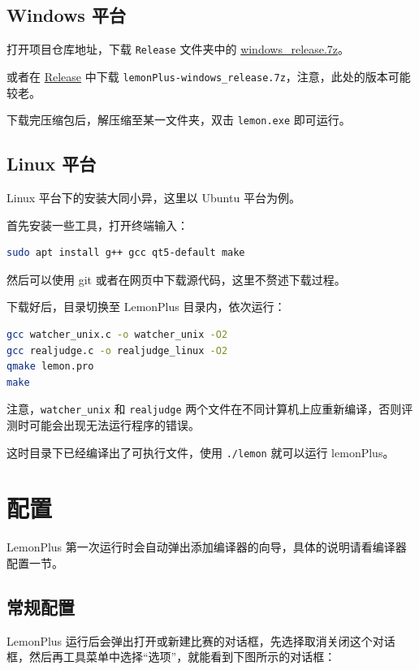 \documentclass[12pt, a4paper]{article}
\begin{document}
\subsection{Windows 平台}
打开项目仓库地址，下载 \texttt{Release} 文件夹中的 \href{https://raw.githubusercontent.com/Dust1404/Project_LemonPlus/master/Release/windows_release.7z}{windows\_release.7z}。

或者在 \href{https://github.com/Dust1404/Project_LemonPlus/releases}{Release} 中下载 \texttt{lemonPlus-windows\_release.7z}，注意，此处的版本可能较老。

下载完压缩包后，解压缩至某一文件夹，双击 \texttt{lemon.exe} 即可运行。

\subsection{Linux 平台}\label{linux install}
Linux 平台下的安装大同小异，这里以 Ubuntu 平台为例。

首先安装一些工具，打开终端输入：

\begin{lstlisting}[language=bash,frame=shadowbox,basicstyle=\ttfamily]
sudo apt install g++ gcc qt5-default make
\end{lstlisting}

然后可以使用 git 或者在网页中下载源代码，这里不赘述下载过程。

下载好后，目录切换至 LemonPlus 目录内，依次运行：

\begin{lstlisting}[language=bash,frame=shadowbox,basicstyle=\ttfamily]
gcc watcher_unix.c -o watcher_unix -O2
gcc realjudge.c -o realjudge_linux -O2
qmake lemon.pro
make
\end{lstlisting}

注意，\texttt{watcher\_unix} 和 \texttt{realjudge} 两个文件在不同计算机上应重新编译，否则评测时可能会出现无法运行程序的错误。

这时目录下已经编译出了可执行文件，使用 \texttt{./lemon} 就可以运行 lemonPlus。

\newpage

\section{配置}

LemonPlus 第一次运行时会自动弹出添加编译器的向导，具体的说明请看编译器配置一节。

\subsection{常规配置}
LemonPlus 运行后会弹出打开或新建比赛的对话框，先选择取消关闭这个对话框，然后再工具菜单中选择“选项”，就能看到下图所示的对话框：
\end{document}
